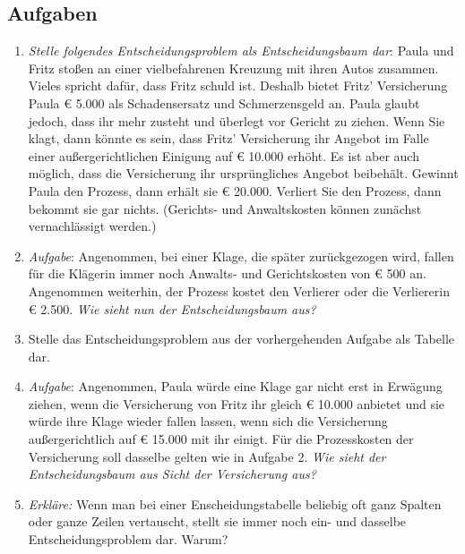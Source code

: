 \subsection{Aufgaben}

\begin{enumerate}
  \item {\em Stelle folgendes Ent\-scheidungs\-problem als
  Ent\-scheidungs\-baum dar}: Paula und Fritz stoßen an einer vielbefahrenen
  Kreuzung mit ihren Autos zusammen. Vieles spricht dafür, dass Fritz schuld ist. Deshalb bietet Fritz'
  Versicherung Paula € 5.000 als Schadensersatz und Schmerzensgeld an.
  Paula glaubt jedoch, dass ihr mehr zusteht und überlegt vor Gericht
  zu ziehen. Wenn Sie klagt, dann könnte es sein, dass Fritz' Versicherung ihr
  Angebot im Falle einer außergerichtlichen Einigung auf € 10.000 erhöht. Es ist
  aber auch möglich, dass die Versicherung ihr ursprüngliches Angebot
  beibehält. Gewinnt Paula den Prozess, dann erhält sie € 20.000. Verliert Sie
  den Prozess, dann bekommt sie gar nichts. (Gerichts- und Anwaltskosten können
  zunächst vernachlässigt werden.)

  \item {\em Aufgabe}: Angenommen, bei einer Klage, die später zurückgezogen
  wird, fallen für die Klägerin immer noch Anwalts- und Gerichtskosten von €
 500 an. Angenommen weiterhin, der Prozess kostet den Verlierer oder die
 Verliererin € 2.500. {\em Wie sieht nun der Entscheidungsbaum aus?}

 \item Stelle das Entscheidungsproblem aus der vorhergehenden Aufgabe als
 Tabelle dar.

 \item {\em Aufgabe}: Angenommen, Paula würde eine
  Klage gar nicht erst in Erwägung ziehen, wenn die Versicherung von Fritz ihr
  gleich € 10.000 anbietet und sie würde ihre Klage wieder fallen lassen, wenn
  sich die Versicherung außergerichtlich auf € 15.000 mit ihr einigt. Für die
  Prozesskosten der Versicherung soll dasselbe gelten wie in Aufgabe 2. {\em Wie
  sieht der Entscheidungsbaum aus Sicht der Versicherung aus?}

 \item \label{ZeilenSpaltenPermutation} {\em Erkläre:} Wenn man bei einer
 Enscheidungstabelle beliebig oft ganz Spalten oder ganze Zeilen vertauscht,
 stellt sie immer noch ein- und dasselbe Entscheidungsproblem dar. Warum?



\end{enumerate}
